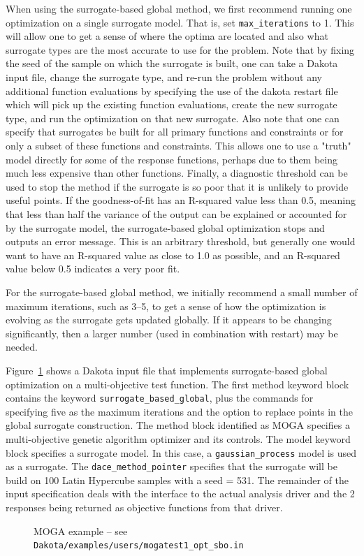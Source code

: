 When using the surrogate-based global method, we first recommend
running one optimization on a single surrogate model. That is, set
\texttt{max\_iterations} to 1.  This will allow one to get a sense of
where the optima are located and also what surrogate types are the
most accurate to use for the problem.  Note that by fixing the seed of
the sample on which the surrogate is built, one can take a Dakota
input file, change the surrogate type, and re-run the problem without
any additional function evaluations by specifying the use of the
dakota restart file which will pick up the existing function
evaluations, create the new surrogate type, and run the optimization
on that new surrogate.  Also note that one can specify that surrogates
be built for all primary functions and constraints or for only a
subset of these functions and constraints.  This allows one to use a
"truth" model directly for some of the response functions, perhaps due
to them being much less expensive than other functions.  Finally, a
diagnostic threshold can be used to stop the method if the surrogate
is so poor that it is unlikely to provide useful points.  If the
goodness-of-fit has an R-squared value less than 0.5, meaning that
less than half the variance of the output can be explained or
accounted for by the surrogate model, the surrogate-based global
optimization stops and outputs an error message.  This is an arbitrary
threshold, but generally one would want to have an R-squared value as
close to 1.0 as possible, and an R-squared value below 0.5 indicates a
very poor fit.

For the surrogate-based global method, we initially recommend a small
number of maximum iterations, such as 3--5, to get a sense of how the
optimization is evolving as the surrogate gets updated globally.  If
it appears to be changing significantly, then a larger number (used in
combination with restart) may be needed.

Figure~\ref{sbm:sbgm_moga} shows a Dakota input file that implements
surrogate-based global optimization on a multi-objective test function. 
The first method keyword block contains the
keyword \texttt{surrogate\_based\_global}, plus the commands for
specifying five as the maximum iterations and the option to replace 
points in the global surrogate construction. The method block identified 
as MOGA specifies a multi-objective genetic algorithm optimizer and its 
controls.  The model keyword block specifies a surrogate model.  
In this case, a \texttt{gaussian\_process} model is used as a surrogate. 
The \texttt{dace\_method\_pointer} specifies that the surrogate will be 
build on 100 Latin Hypercube samples with a seed = 531.
The remainder of the input specification deals with the interface 
to the actual analysis driver and the 2 responses being returned 
as objective functions from that driver. 

\begin{figure}
  \begin{bigbox}
    \begin{scriptsize}
    \end{scriptsize}
  \end{bigbox}
  \caption{MOGA example -- 
see \texttt{Dakota/examples/users/mogatest1\_opt\_sbo.in} }
  \label{sbm:sbgm_moga}
\end{figure}
